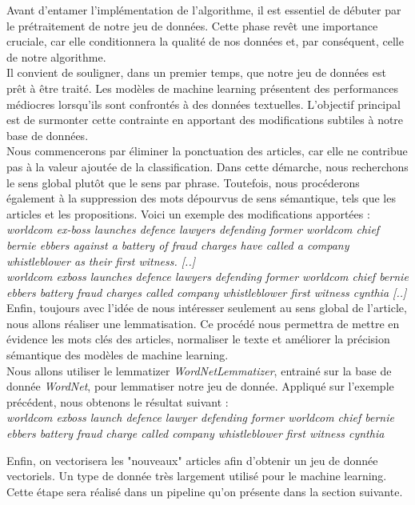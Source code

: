 \documentclass[a4paper,12pt]{article}
\begin{document}
Avant d'entamer l'implémentation de l'algorithme, il est essentiel de débuter par le prétraitement de notre jeu de données. Cette phase revêt une importance cruciale, car elle conditionnera la qualité de nos données et, par conséquent, celle de notre algorithme.\\

Il convient de souligner, dans un premier temps, que notre jeu de données est prêt à être traité. Les modèles de machine learning présentent des performances médiocres lorsqu'ils sont confrontés à des données textuelles. L'objectif principal est de surmonter cette contrainte en apportant des modifications subtiles à notre base de données.\\

Nous commencerons par éliminer la ponctuation des articles, car elle ne contribue pas à la valeur ajoutée de la classification. Dans cette démarche, nous recherchons le sens global plutôt que le sens par phrase. Toutefois, nous procéderons également à la suppression des mots dépourvus de sens sémantique, tels que les articles et les propositions. Voici un exemple des modifications apportées :\\

\textit{worldcom ex-boss launches defence lawyers defending former worldcom chief bernie ebbers against a battery of fraud charges have called a company whistleblower as their first witness. [..]}\\
\textit{worldcom exboss launches defence lawyers defending former worldcom chief bernie ebbers battery fraud charges called company whistleblower first witness cynthia [..]}\\

Enfin, toujours avec l'idée de nous intéresser seulement au sens global de l'article, nous allons réaliser une lemmatisation. Ce procédé nous permettra de mettre en évidence les mots clés des articles, normaliser le texte et améliorer la précision sémantique des modèles de machine learning.\\
Nous allons utiliser le lemmatizer \textit{WordNetLemmatizer}, entrainé sur la base de donnée \textit{WordNet}, pour lemmatiser notre jeu de donnée. Appliqué sur l'exemple précédent, nous obtenons le résultat suivant : \\

\textit{worldcom exboss launch defence lawyer defending former worldcom chief bernie ebbers battery fraud charge called company whistleblower first witness cynthia}

Enfin, on vectorisera les "nouveaux" articles afin d'obtenir un jeu de donnée vectoriels. Un type de donnée très largement utilisé pour le machine learning. Cette étape sera réalisé dans un pipeline qu'on présente dans la section suivante.
\end{document}
